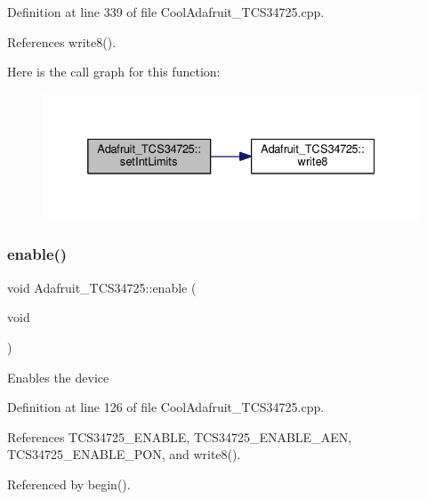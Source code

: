 Definition at line 339 of file Cool\+Adafruit\+\_\+\+T\+C\+S34725.\+cpp.



References write8().

Here is the call graph for this function\+:\nopagebreak
\begin{figure}[H]
\begin{center}
\leavevmode
\includegraphics[width=332pt]{df/d54/class_adafruit___t_c_s34725_ac17b2447df066e30d1e64fe764f88770_cgraph}
\end{center}
\end{figure}
\mbox{\label{class_adafruit___t_c_s34725_ad9a0e1f4f77d32dc0a6d604f7d1d5586}} 
\subsubsection{\texorpdfstring{enable()}{enable()}}
{\footnotesize\ttfamily void Adafruit\+\_\+\+T\+C\+S34725\+::enable (\begin{DoxyParamCaption}\item[{void}]{ }\end{DoxyParamCaption})}

Enables the device 

Definition at line 126 of file Cool\+Adafruit\+\_\+\+T\+C\+S34725.\+cpp.



References T\+C\+S34725\+\_\+\+E\+N\+A\+B\+LE, T\+C\+S34725\+\_\+\+E\+N\+A\+B\+L\+E\+\_\+\+A\+EN, T\+C\+S34725\+\_\+\+E\+N\+A\+B\+L\+E\+\_\+\+P\+ON, and write8().



Referenced by begin().

